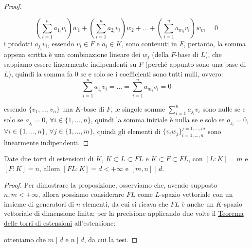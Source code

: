 \documentclass[11pt]{scrartcl}
\begin{document}
\begin{proof}
\begin{itemize}
	\[ \left(\sum_{i=1}^{n} a_{1_i}v_i\right)w_1 +  \left(\sum_{i=1}^{n} a_{2_i}v_i\right)w_2 + \ldots +  \left(\sum_{i=1}^{n} a_{m_i}v_i\right)w_m = 0
	\]
    i prodotti $a_{j_i}v_i$, essendo $v_i \in F$ e $a_i \in K$, sono contenuti in $F$, pertanto, la somma appena scritta è una combinazione lineare dei $w_j$ (della $F$-base di $L$), che sappiamo essere linearmente indipendenti su $F$ (perché appunto sono una base di $L$), quindi la somma fa $0$ se e solo se i coefficienti sono tutti nulli, ovvero:
	\[ \sum_{i=1}^{n} a_{1_i}v_i =\ldots=\sum_{i=1}^{n} a_{m_i}v_i = 0
	\]
	\end{itemize}
    essendo $\{v_1,\ldots,v_n\}$ una $K$-base di $F$, le singole somme $\sum_{i=1}^{n} a_{j_i}v_i$ sono nulle se e solo se $a_{j_i} = 0$, $\forall i \in\{1,\ldots,n\}$, quindi la somma iniziale è nulla se e solo se $a_{j_i} = 0$, $\forall i \in\{1,\ldots,n\}$, $\forall j \in \{1,\ldots,m\}$, quindi gli elementi di $\{v_iw_j\}_{i=1,\ldots,n}^{j=1,\ldots,m}$ sono linearmente indipendenti.
\end{proof}

\begin{proposition}
    \label{3.9}
    Date due torri di estensioni di $K$, $K \subset L \subset FL$ e $K \subset F \subset FL$, con $[L:K] = m$ e $[F:K] = n$, allora $[FL:K] = d < +\infty$ e $[m,n] \mid d$.
\end{proposition}

\begin{proof}
Per dimostrare la proposizione, osserviamo che, avendo supposto $n,m < +\infty$, allora possiamo considerare $FL$ come $L$-spazio vettoriale con un insieme di generatori di $n$ elementi,
da cui si ricava che $FL$ è anche un $K$-spazio vettoriale di dimensione finita; per la precisione applicando due volte il \hyperref[torri]{Teorema delle torri di estensioni} all'estensione:
\begin{center}
\end{center}
otteniamo che $m \mid d$ e $n \mid d$, da cui la tesi.
\end{proof}
\end{document}
